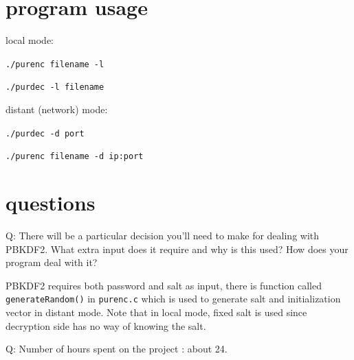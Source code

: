 \documentclass[11pt, oneside]{article}   	%
\begin{document}
\section{program usage}
local mode:

\verb|./purenc filename -l|

\verb|./purdec -l filename|

distant (network) mode:

\verb|./purdec -d port|

\verb|./purenc filename -d ip:port|

\section{questions}
Q: There will be a particular decision you’ll need to make for dealing with PBKDF2. What extra input does it require and why is this used? How does your program deal with it?

PBKDF2 requires both password and salt as input, there is function called \texttt{generateRandom()} in \texttt{purenc.c} which is used to generate salt and initialization vector in distant mode. Note that in local mode, fixed salt is used since decryption side has no way of knowing the salt.


Q: Number of hours spent on the project : about 24.
\end{document}
